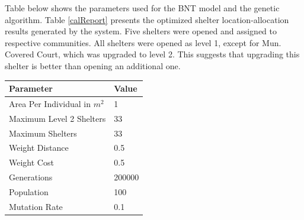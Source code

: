 	Table below shows the parameters used for the BNT model and the genetic algorithm. Table \ref{calReport} presents the optimized shelter location-allocation results generated by the system. Five shelters were opened and assigned to respective communities. All shelters were opened as level 1, except for Mun. Covered Court, which was upgraded to level 2. This suggests that upgrading this shelter is better than opening an additional one.
	
	\begin{table}[h!]
		\renewcommand{\arraystretch}{1.2} 
		\centering
		\begin{tabular}{ll}
			\hline
			\textbf{Parameter} & \textbf{Value} \\ \hline
			Area Per Individual in $m^2$ & 1 \\ 
			Maximum Level 2 Shelters  & 33 \\ 
			Maximum Shelters & 33 \\ 
			Weight Distance & 0.5 \\ 
			Weight Cost & 0.5 \\ 
			Generations & 200000 \\ 
			Population & 100 \\ 
			Mutation Rate & 0.1 \\ \hline
		\end{tabular}
	\end{table}
	
